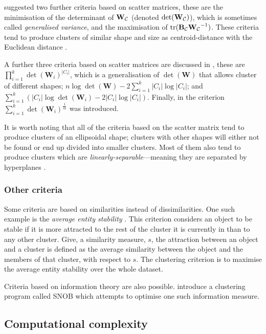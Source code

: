 \citet{friedman1967criteria} suggested two further criteria based on scatter
matrices, these are the minimisation of the determinant of
$\mathbf{W_{\mathcal{C}}}$ (denoted $\det(\mathbf{W}_{\mathcal{C}})$), which is sometimes
called \textit{generalised variance}, and the maximisation of
$\operatorname*{tr}(\mathbf{B_{\mathcal{C}}W_{\mathcal{C}}}^{-1})$.  These criteria tend to produce
clusters of similar shape and size as centroid-distance with the Euclidean
distance \citep{marriott1982optimization}.

A further three criteria based on scatter matrices are discussed in
\citep{marriott1982optimization}, these are
$\prod_{i=1}^{k}\det(\mathbf{W}_i)^{|C_i|}$, which is a generalisation of
$\det(\mathbf{W})$ that allows cluster of different shapes; $n
\log{\det(\mathbf{W})} - 2\sum_{i=1}^{k} |C_i| \log{|C_i|}$; and
$\sum_{i=1}^{k} (|C_i| \log{\det(\mathbf{W}_i)} - 2|C_i|\log{|C_i|})$.
Finally, in \citep{maronna1974} the criterion
$\sum_{i=1}^{k}\det(\mathbf{W}_i)^{\frac{1}{m}}$ was introduced.

It is worth noting that all of the criteria based on the scatter matrix tend
to produce clusters of an ellipsoidal shape; clusters with other shapes will
either not be found or end up divided into smaller clusters.  Most of them
also tend to produce clusters which are \textit{linearly-separable}---meaning
they are separated by hyperplanes \citep{marriott1982optimization}.

\subsubsection{Other criteria}
\label{sec:other-criteria}

Some criteria are based on similarities instead of dissimilarities.  One such
example is the \textit{average entity stability} \citep{Rubin67optimal}.  This
criterion considers an object to be stable if it is more attracted to the rest
of the cluster it is currently in than to any other cluster.  Give, a
similarity measure, $s$, the attraction between an object and a cluster is
defined as the average similarity between the object and the members of that
cluster, with respect to $s$.  The clustering criterion is to maximise the
average entity stability over the whole dataset.

Criteria based on information theory are also possible.
\citet{wallace1968information} introduce a clustering program called SNOB
which attempts to optimise one such information measure.

\subsection{Computational complexity}
\label{sec:complexity-issues}

